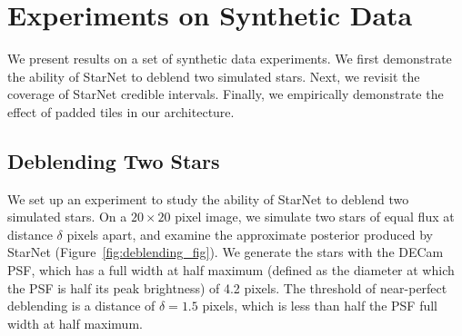\section{Experiments on Synthetic Data}

We present results on a set of synthetic data experiments.
We first demonstrate the ability of StarNet to deblend two simulated stars. 
Next, we revisit the coverage of StarNet credible intervals. 
Finally, we empirically demonstrate the effect of padded tiles
in our architecture. 

\subsection{Deblending Two Stars}

We set up an experiment to study the
ability of StarNet to deblend two simulated stars.
On a $20\times20$ pixel image,
we simulate two stars of equal flux at distance $\delta$ pixels apart, and
examine the approximate posterior produced by StarNet (Figure~\ref{fig:deblending_fig}).
We generate the stars with the DECam PSF, which 
has a full width at half maximum 
(defined as the diameter at which the PSF is half its peak brightness) of 4.2 pixels. 
The threshold of near-perfect deblending is a distance of $\delta = 1.5$ pixels, which is less than half the PSF 
full width at half maximum. 

